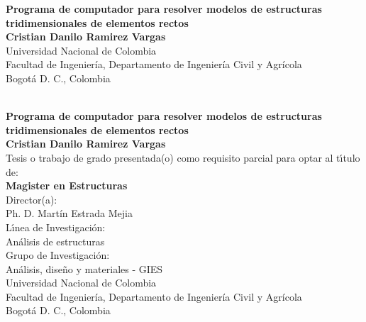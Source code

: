 \begin{center}
\begin{figure}
\centering%
%
\end{figure}
\thispagestyle{empty} \vspace*{2.0cm} \textbf{\huge
Programa de computador para resolver modelos de estructuras tridimensionales de elementos rectos}\\[6.0cm]
\Large\textbf{Cristian Danilo Ramirez Vargas}\\[5.0cm]
\small Universidad Nacional de Colombia\\
Facultad de Ingeniería, Departamento de Ingeniería Civil y Agrícola\\
Bogotá D. C., Colombia\\
\the\year\\
\end{center}

\newpage{\pagestyle{empty}\cleardoublepage}

\newpage
\begin{center}
\thispagestyle{empty} \vspace*{0cm} \textbf{\huge
Programa de computador para resolver modelos de estructuras tridimensionales de elementos rectos}\\[2.0cm]
\Large\textbf{Cristian Danilo Ramirez Vargas}\\[3.0cm]
\small Tesis o trabajo de grado presentada(o) como requisito parcial para optar al
t\'{\i}tulo de:\\
\textbf{Magister en Estructuras}\\[2.5cm]
Director(a):\\
Ph. D. Martín Estrada Mejia\\[2.0cm]
L\'{\i}nea de Investigaci\'{o}n:\\
Análisis de estructuras\\
Grupo de Investigaci\'{o}n:\\
Análisis, diseño y materiales - GIES\\[2.5cm]
Universidad Nacional de Colombia\\
Facultad de Ingeniería, Departamento de Ingeniería Civil y Agrícola\\
Bogotá D. C., Colombia\\
\the\year\\
\end{center}

\newpage{\pagestyle{empty}\cleardoublepage}

